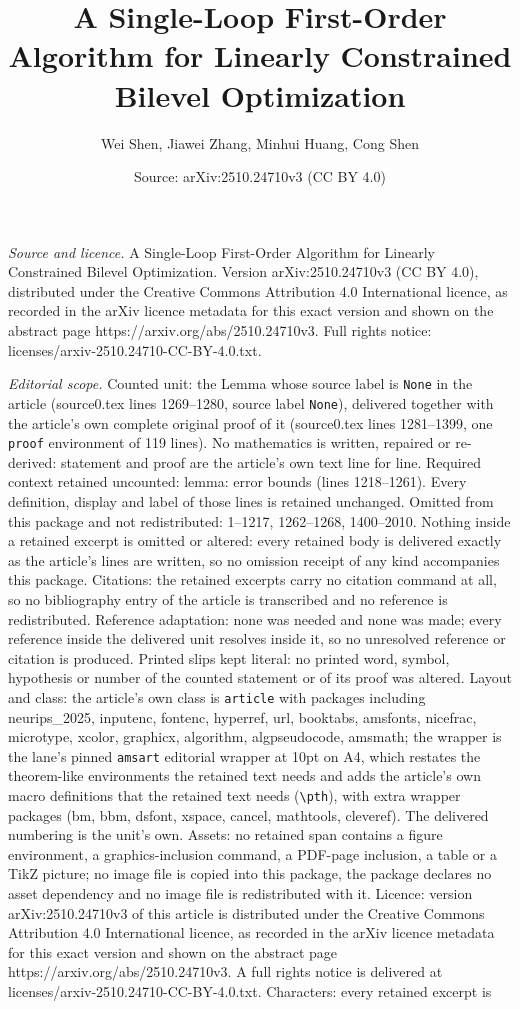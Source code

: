 \documentclass[10pt,a4paper]{amsart}
\title[A Single-Loop First-Order Algorithm for Linearly Constrained]{A Single-Loop First-Order Algorithm for Linearly Constrained Bilevel Optimization}
\author{Wei Shen, Jiawei Zhang, Minhui Huang, Cong Shen}
\date{Source: arXiv:2510.24710v3 (CC BY 4.0)}
\begin{document}
\maketitle

\noindent\emph{Source and licence.} A Single-Loop First-Order Algorithm for Linearly Constrained Bilevel Optimization. Version arXiv:2510.24710v3 (CC BY 4.0), distributed under the Creative Commons Attribution 4.0 International licence, as recorded in the arXiv licence metadata for this exact version and shown on the abstract page https://arxiv.org/abs/2510.24710v3. Full rights notice: licenses/arxiv-2510.24710-CC-BY-4.0.txt.\par\smallskip

\noindent\textit{Editorial scope.} Counted unit: the Lemma whose source label is \texttt{None} in the article (source0.tex lines 1269--1280, source label \texttt{None}), delivered together with the article's own complete original proof of it (source0.tex lines 1281--1399, one \texttt{proof} environment of 119 lines). No mathematics is written, repaired or re-derived: statement and proof are the article's own text line for line. Required context retained uncounted: lemma: error bounds (lines 1218--1261). Every definition, display and label of those lines is retained unchanged. Omitted from this package and not redistributed: 1--1217, 1262--1268, 1400--2010. Nothing inside a retained excerpt is omitted or altered: every retained body is delivered exactly as the article's lines are written, so no omission receipt of any kind accompanies this package. Citations: the retained excerpts carry no citation command at all, so no bibliography entry of the article is transcribed and no reference is redistributed. Reference adaptation: none was needed and none was made; every reference inside the delivered unit resolves inside it, so no unresolved reference or citation is produced. Printed slips kept literal: no printed word, symbol, hypothesis or number of the counted statement or of its proof was altered. Layout and class: the article's own class is \texttt{article} with packages including neurips\_2025, inputenc, fontenc, hyperref, url, booktabs, amsfonts, nicefrac, microtype, xcolor, graphicx, algorithm, algpseudocode, amsmath; the wrapper is the lane's pinned \texttt{amsart} editorial wrapper at 10pt on A4, which restates the theorem-like environments the retained text needs and adds the article's own macro definitions that the retained text needs (\texttt{\textbackslash pth}), with extra wrapper packages (bm, bbm, dsfont, xspace, cancel, mathtools, cleveref). The delivered numbering is the unit's own. Assets: no retained span contains a figure environment, a graphics-inclusion command, a PDF-page inclusion, a table or a TikZ picture; no image file is copied into this package, the package declares no asset dependency and no image file is redistributed with it. Licence: version arXiv:2510.24710v3 of this article is distributed under the Creative Commons Attribution 4.0 International licence, as recorded in the arXiv licence metadata for this exact version and shown on the abstract page https://arxiv.org/abs/2510.24710v3. A full rights notice is delivered at licenses/arxiv-2510.24710-CC-BY-4.0.txt. Characters: every retained excerpt is 
\end{document}
